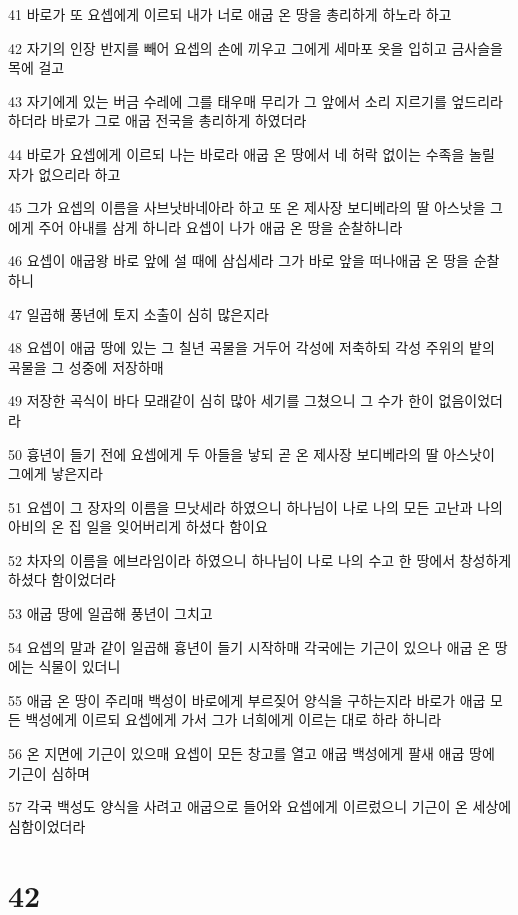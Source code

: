 \par 41 바로가 또 요셉에게 이르되 내가 너로 애굽 온 땅을 총리하게 하노라 하고
\par 42 자기의 인장 반지를 빼어 요셉의 손에 끼우고 그에게 세마포 옷을 입히고 금사슬을 목에 걸고
\par 43 자기에게 있는 버금 수레에 그를 태우매 무리가 그 앞에서 소리 지르기를 엎드리라 하더라 바로가 그로 애굽 전국을 총리하게 하였더라
\par 44 바로가 요셉에게 이르되 나는 바로라 애굽 온 땅에서 네 허락 없이는 수족을 놀릴 자가 없으리라 하고
\par 45 그가 요셉의 이름을 사브낫바네아라 하고 또 온 제사장 보디베라의 딸 아스낫을 그에게 주어 아내를 삼게 하니라 요셉이 나가 애굽 온 땅을 순찰하니라
\par 46 요셉이 애굽왕 바로 앞에 설 때에 삼십세라 그가 바로 앞을 떠나애굽 온 땅을 순찰하니
\par 47 일곱해 풍년에 토지 소출이 심히 많은지라
\par 48 요셉이 애굽 땅에 있는 그 칠년 곡물을 거두어 각성에 저축하되 각성 주위의 밭의 곡물을 그 성중에 저장하매
\par 49 저장한 곡식이 바다 모래같이 심히 많아 세기를 그쳤으니 그 수가 한이 없음이었더라
\par 50 흉년이 들기 전에 요셉에게 두 아들을 낳되 곧 온 제사장 보디베라의 딸 아스낫이 그에게 낳은지라
\par 51 요셉이 그 장자의 이름을 므낫세라 하였으니 하나님이 나로 나의 모든 고난과 나의 아비의 온 집 일을 잊어버리게 하셨다 함이요
\par 52 차자의 이름을 에브라임이라 하였으니 하나님이 나로 나의 수고 한 땅에서 창성하게 하셨다 함이었더라
\par 53 애굽 땅에 일곱해 풍년이 그치고
\par 54 요셉의 말과 같이 일곱해 흉년이 들기 시작하매 각국에는 기근이 있으나 애굽 온 땅에는 식물이 있더니
\par 55 애굽 온 땅이 주리매 백성이 바로에게 부르짖어 양식을 구하는지라 바로가 애굽 모든 백성에게 이르되 요셉에게 가서 그가 너희에게 이르는 대로 하라 하니라
\par 56 온 지면에 기근이 있으매 요셉이 모든 창고를 열고 애굽 백성에게 팔새 애굽 땅에 기근이 심하며
\par 57 각국 백성도 양식을 사려고 애굽으로 들어와 요셉에게 이르렀으니 기근이 온 세상에 심함이었더라

\chapter{42}

